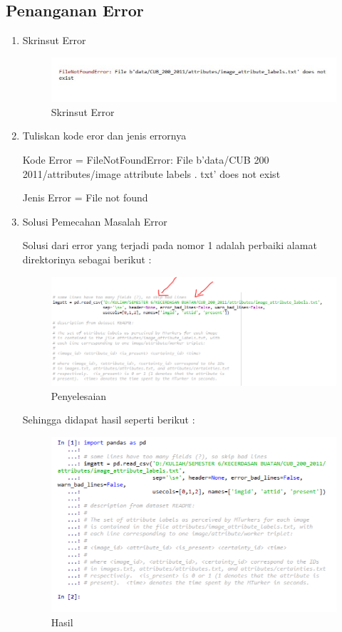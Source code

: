 \subsection{Penanganan Error}
\begin{enumerate}
\item Skrinsut Error
	\begin{figure}[!hbtp]
	\centering
	\includegraphics[scale=0.5]{figures/AIP/ai37.PNG}
	\caption{Skrinsut Error}
	\label{contoh}
	\end{figure}
\item Tuliskan kode eror dan jenis errornya
	\par Kode Error = FileNotFoundError: File b'data/CUB 200 2011/attributes/image attribute labels . txt' does not exist
	\par Jenis Error = File not found
\item Solusi Pemecahan Masalah Error
\par Solusi dari error yang terjadi pada nomor 1 adalah perbaiki alamat direktorinya sebagai berikut :
	\begin{figure}[!hbtp]
	\centering
	\includegraphics[scale=0.5]{figures/AIP/ai38.PNG}
	\caption{Penyelesaian}
	\label{contoh}
	\end{figure}
\par Sehingga didapat hasil seperti berikut :
	\begin{figure}[!hbtp]
	\centering
	\includegraphics[scale=0.5]{figures/AIP/ai39.PNG}
	\caption{Hasil}
	\label{contoh}
	\end{figure}
\end{enumerate}

